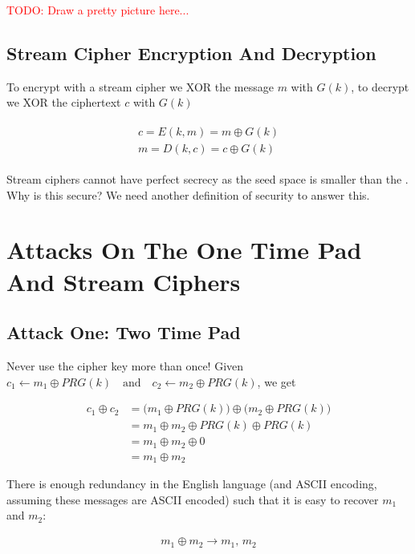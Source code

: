 \documentclass[11pt,a4paper]{report}
\newcommand\todo[1]{\noindent\textcolor{red}{TODO: #1}}
\begin{document}
\todo{Draw a pretty picture here...} 


\subsection{Stream Cipher Encryption And Decryption}
\noindent
To encrypt with a stream cipher we XOR the message $m$ with $G(k)$, to decrypt we XOR the ciphertext $c$ with $G(k)$

\begin{gather}
\begin{gathered}
	c = E(k, m) = m \oplus G(k) \\
	m = D(k, c) = c \oplus G(k)
\end{gathered}
\end{gather}

Stream ciphers cannot have perfect secrecy as the seed space is smaller than the . Why is this secure? We need another definition of security to answer this.



\section{Attacks On The One Time Pad And Stream Ciphers}
\subsection{Attack One: Two Time Pad}
Never use the cipher key more than once! Given $ c_1 \leftarrow m_1 \oplus PRG(k) \quad \textrm{and} \quad	c_2 \leftarrow m_2 \oplus PRG(k)$, we get

\begin{equation} \label{eq1}
\begin{split}
	c_1 \oplus c_2 	& = \big( m_1 \oplus PRG(k) \big) \oplus \big( m_2 \oplus PRG(k) \big) \\	
	 				& = m_1 \oplus m_2 \oplus PRG(k) \oplus PRG(k) \\
	 				& = m_1 \oplus m_2	\oplus 0 \\
	 				& = m_1 \oplus m_2
\end{split}
\end{equation}

There is enough redundancy in the English language (and ASCII encoding, assuming these messages are ASCII encoded) such that it is easy to recover $m_1$ and $m_2$:

\begin{equation*} 
\begin{split}
	m_1 \oplus m_2 \rightarrow m_1,\,m_2
\end{split}
\end{equation*}
\end{document}
